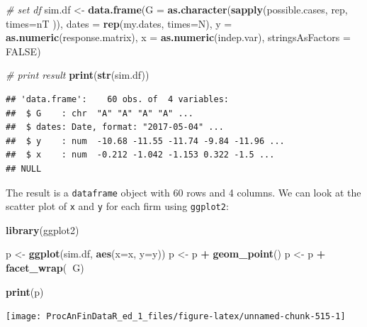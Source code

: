 \documentclass[11pt,]{book}
\newenvironment{Shaded}{\begin{snugshade}}{\end{snugshade}}
\newcommand{\KeywordTok}[1]{\textcolor[rgb]{0.27,0.27,0.27}{\textbf{#1}}}
\newcommand{\DataTypeTok}[1]{\textcolor[rgb]{0.27,0.27,0.27}{#1}}
\newcommand{\StringTok}[1]{\textcolor[rgb]{0.5,0.5,0.5}{#1}}
\newcommand{\CommentTok}[1]{\textcolor[rgb]{0.56,0.35,0.01}{\textit{#1}}}
\newcommand{\OtherTok}[1]{\textcolor[rgb]{0.56,0.35,0.01}{#1}}
\newcommand{\OperatorTok}[1]{\textcolor[rgb]{0.81,0.36,0.00}{\textbf{#1}}}
\newcommand{\NormalTok}[1]{#1}
\begin{document}
\begin{Shaded}
\begin{Highlighting}[]
\CommentTok{# set df}
\NormalTok{sim.df <-}\StringTok{ }\KeywordTok{data.frame}\NormalTok{(}\DataTypeTok{G =} \KeywordTok{as.character}\NormalTok{(}\KeywordTok{sapply}\NormalTok{(possible.cases, }
\NormalTok{                                             rep, }
                                             \DataTypeTok{times=}\NormalTok{nT )),}
                     \DataTypeTok{dates =} \KeywordTok{rep}\NormalTok{(my.dates, }\DataTypeTok{times=}\NormalTok{N),}
                     \DataTypeTok{y =} \KeywordTok{as.numeric}\NormalTok{(response.matrix),}
                     \DataTypeTok{x =} \KeywordTok{as.numeric}\NormalTok{(indep.var), }
                     \DataTypeTok{stringsAsFactors =} \OtherTok{FALSE}\NormalTok{)}

\CommentTok{# print result}
\KeywordTok{print}\NormalTok{(}\KeywordTok{str}\NormalTok{(sim.df))}
\end{Highlighting}
\end{Shaded}

\begin{verbatim}
## 'data.frame':    60 obs. of  4 variables:
##  $ G    : chr  "A" "A" "A" "A" ...
##  $ dates: Date, format: "2017-05-04" ...
##  $ y    : num  -10.68 -11.55 -11.74 -9.84 -11.96 ...
##  $ x    : num  -0.212 -1.042 -1.153 0.322 -1.5 ...
## NULL
\end{verbatim}

The result is a \texttt{dataframe} object with 60 rows and 4 columns. We
can look at the scatter plot of \texttt{x} and \texttt{y} for each firm
using \texttt{ggplot2}:

\begin{Shaded}
\begin{Highlighting}[]
\KeywordTok{library}\NormalTok{(ggplot2)}

\NormalTok{p <-}\StringTok{ }\KeywordTok{ggplot}\NormalTok{(sim.df, }\KeywordTok{aes}\NormalTok{(}\DataTypeTok{x=}\NormalTok{x, }\DataTypeTok{y=}\NormalTok{y))}
\NormalTok{p <-}\StringTok{ }\NormalTok{p }\OperatorTok{+}\StringTok{ }\KeywordTok{geom_point}\NormalTok{()}
\NormalTok{p <-}\StringTok{ }\NormalTok{p }\OperatorTok{+}\StringTok{ }\KeywordTok{facet_wrap}\NormalTok{(}\OperatorTok{~}\NormalTok{G)}

\KeywordTok{print}\NormalTok{(p)}
\end{Highlighting}
\end{Shaded}

\begin{center}\texttt{[image: ProcAnFinDataR\_ed\_1\_files/figure-latex/unnamed-chunk-515-1]} \end{center}
\end{document}
